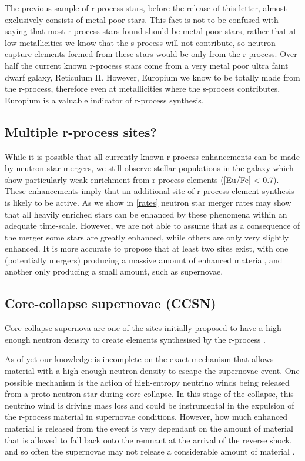 \documentclass[a4paper,fleqn,usenatbib]{mnras}
\begin{document}
	The previous sample of r-process stars, before the release of this letter, almost exclusively consists of metal-poor stars. This fact is not to be confused with saying that most r-process stars found should be metal-poor stars, rather that at low metallicities we know that the s-process will not contribute, so neutron capture elements formed from these stars would be only from the r-process. Over half the current known r-process stars come from a very metal poor ultra faint dwarf galaxy, Reticulum II. However, Europium we know to be totally made from the r-process, therefore even at metallicities where the s-process contributes, Europium is a valuable indicator of r-process synthesis.
	
	\subsection{Multiple r-process sites?}
	While it is possible that all currently known r-process enhancements can be made by neutron star mergers, we still observe stellar populations in the galaxy which show particularly weak enrichment from r-process elements ([Eu/Fe] < 0.7). These enhancements imply that an additional site of r-process element synthesis is likely to be active. As we show in \ref{rates}  neutron star merger rates may show that all heavily enriched stars can be enhanced by these phenomena within an adequate time-scale. However, we are not able to assume that as a consequence of the merger some stars are greatly enhanced, while others are only very slightly enhanced. It is more accurate to propose that at least two sites exist, with one (potentially mergers) producing a massive amount of enhanced material, and another only producing a small amount, such as supernovae. 
	
	\subsection{Core-collapse supernovae (CCSN)}
	Core-collapse supernova are one of the sites initially proposed to have a high enough neutron density to create elements synthesised by the r-process \citep{Burbidge1957}. 
	
	As of yet our knowledge is incomplete on the exact mechanism that allows material with a high enough neutron density to escape the supernovae event.
	One possible mechanism is the action of high-entropy neutrino winds being released from a proto-neutron star during core-collapse. In this stage of the collapse, this neutrino wind is driving mass loss and could be instrumental in the expulsion of the r-process material in supernovae conditions. However, how much enhanced material is released from the event is very dependant on the amount of material that is allowed to fall back onto the remnant at the arrival of the reverse shock, and so often the supernovae may not release a considerable amount of material \citep{Woosley1992, Burrows1995}. 
	
\end{document}
